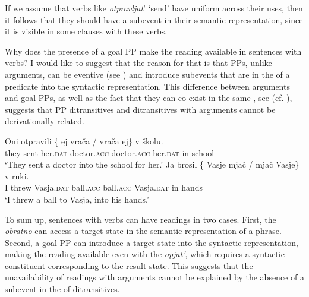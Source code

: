 \documentclass[output=paper]{langscibook}
\begin{document}
\noindent If we assume that  verbs like \textit{otpravljat}’ ‘send’ have uniform  across their uses, then it follows that they should have a  subevent in their semantic representation, since it is visible in some clauses with these verbs.

Why does the presence of a goal PP make the  reading available in sentences with  verbs? I would like to suggest that the reason for that is that PPs, unlike  arguments, can be eventive (see \citealt{McIntyre2006}) and introduce subevents that are  in the  of a predicate into the syntactic representation. This difference between  arguments and goal PPs, as well as the fact that they can co-exist in the same , see  (cf.  ), suggests that PP ditransitives and ditransitives with  arguments cannot be derivationally related.


 \ea\label{ex:bondarenko:25x}\ea\label{ex:bondarenko:25}
\gll Oni otpravili \{\hspace{-2pt} ej vrača / vrača ej\} v školu.\\
     they sent {} her.\textsc{dat} doctor.\textsc{acc} {} doctor.\textsc{acc} her.\textsc{dat} in school\\
\glt `They sent a doctor into the school for her.'
 \ex\label{ex:bondarenko:26}
\gll Ja brosil \{\hspace{-2pt} Vasje mjač / mjač Vasje\} v ruki.\\
     I threw {} Vasja.\textsc{dat} ball.\textsc{acc} {} ball.\textsc{acc} Vasja.\textsc{dat} in hands\\
\glt `I threw a ball to Vasja, into his hands.'
\z\z

 \ea\label{ex:bondarenko:27x}\label{ex:bondarenko:27}
\z\z


\noindent To sum up, sentences with   verbs can have  readings in two cases. First, the  \textit{obratno} can access a target state in the semantic representation of a  phrase. Second, a goal PP can introduce a target state into the syntactic representation, making the  reading available even with the   \textit{opjat’}, which requires a syntactic constituent corresponding to the result state. This suggests that the unavailability of  readings with  arguments cannot be explained by the absence of a  subevent in the  of  ditransitives.
\end{document}
